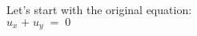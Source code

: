 \documentclass[preview]{standalone}
\begin{document}
\begin{center}
Let's start with the original equation: \\$u_x\;$$+\;$$u_y\;$$=\;$$0$
\end{center}
\end{document}
